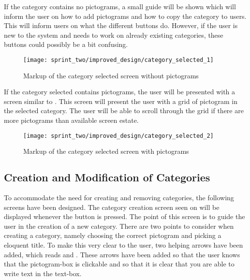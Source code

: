 If the category contains no pictograms, a small guide will be shown which will inform the user on how to add pictograms and how to copy the category to users. This will inform users on what the different buttons do. However, if the user is new to the system and needs to work on already existing categories, these buttons could possibly be a bit confusing. \\

\begin{figure}[!htbp]
    \centering
    \texttt{[image: sprint\_two/improved\_design/category\_selected\_1]}
    \caption{Markup of the category selected screen without pictograms}
    \label{fig:improved_design_category_selected_1}
\end{figure}

If the category selected contains pictograms, the user will be presented with a screen similar to . This screen will present the user with a grid of pictogram in the selected category. The user will be able to scroll through the grid if there are more pictograms than available screen estate. 

\begin{figure}[!htbp]
    \centering
    \texttt{[image: sprint\_two/improved\_design/category\_selected\_2]}
    \caption{Markup of the category selected screen with pictograms}
    \label{fig:improved_design_category_selected_2}
\end{figure}

\subsection{Creation and Modification of Categories}
To accommodate the need for creating and removing categories, the following screens have been designed. The category creation screen seen on  will be displayed whenever the  button is pressed. The point of this screen is to guide the user in the creation of a new category. There are two points to consider when creating a category, namely choosing the correct pictogram and picking a eloquent title. To make this very clear to the user, two helping arrows have been added, which reads  and . These arrows have been added so that the user knows that the pictogram-box is clickable and so that it is clear that you are able to write text in the text-box. 

